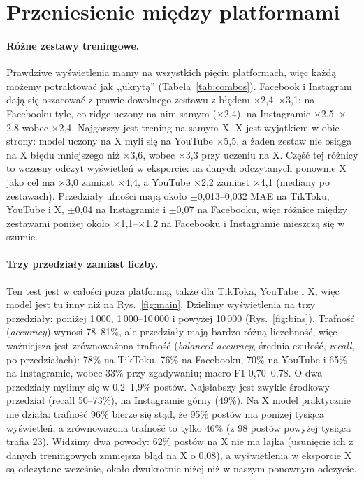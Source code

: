 \documentclass[10pt,a4paper]{article}
\newcommand{\x}[1]{$\times$#1}
\begin{document}
\section{Przeniesienie między platformami}\label{sec:transfer}

\paragraph{Różne zestawy treningowe.} Prawdziwe wyświetlenia mamy na wszystkich pięciu platformach, więc każdą możemy
potraktować jak ,,ukrytą'' (Tabela~\ref{tab:combos}). Facebook i Instagram dają się oszacować z prawie dowolnego
zestawu z błędem \x{2,4}--\x{3,1}: na Facebooku tyle, co ridge uczony na nim samym (\x{2,4}), na Instagramie
\x{2,5}--\x{2,8} wobec \x{2,4}. Najgorszy jest trening na samym X. X jest wyjątkiem w obie strony: model uczony na X myli
się na YouTube \x{5,5}, a żaden zestaw nie osiąga na X błędu mniejszego niż \x{3,6}, wobec \x{3,3} przy uczeniu na X.
Część tej różnicy to wczesny odczyt wyświetleń w eksporcie: na danych odczytanych ponownie X jako cel ma \x{3,0} zamiast
\x{4,4}, a YouTube \x{2,2} zamiast \x{4,1} (mediany po zestawach). Przedziały ufności mają około $\pm$0,013--0,032 MAE na
TikToku, YouTube i X, $\pm$0,04 na Instagramie i $\pm$0,07 na Facebooku, więc różnice między zestawami poniżej około
\x{1,1}--\x{1,2} na Facebooku i Instagramie mieszczą się w szumie.



\paragraph{Trzy przedziały zamiast liczby.} Ten test jest w całości poza platformą, także dla TikToka, YouTube i X, więc
model jest tu inny niż na Rys.~\ref{fig:main}. Dzielimy wyświetlenia na trzy przedziały: poniżej 1\,000,
1\,000--10\,000 i powyżej 10\,000 (Rys.~\ref{fig:bins}). Trafność (\emph{accuracy}) wynosi 78--81\%, ale przedziały mają
bardzo różną liczebność, więc ważniejsza jest zrównoważona trafność (\emph{balanced accuracy}, średnia czułość,
\emph{recall}, po przedziałach): 78\% na TikToku, 76\% na Facebooku, 70\% na YouTube i 65\% na Instagramie, wobec 33\%
przy zgadywaniu; macro F1 0,70--0,78. O dwa przedziały mylimy się w 0,2--1,9\% postów. Najsłabszy jest zwykle środkowy
przedział (recall 50--73\%), na Instagramie górny (49\%). Na X model praktycznie nie działa: trafność 96\% bierze się
stąd, że 95\% postów ma poniżej tysiąca wyświetleń, a zrównoważona trafność to tylko 46\% (z 98 postów powyżej tysiąca
trafia 23). Widzimy dwa powody: 62\% postów na X nie ma lajka (usunięcie ich z danych treningowych zmniejsza błąd na X
o 0,08), a wyświetlenia w eksporcie X są odczytane wcześnie, około dwukrotnie niżej niż w naszym ponownym odczycie.
\end{document}
